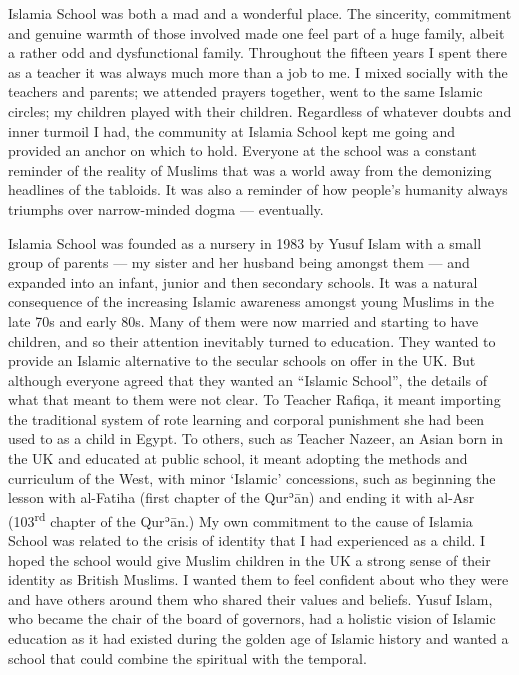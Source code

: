 \documentclass[12pt]{memoir}
\def\´{ʾ} %
\let \Sup=\textsuperscript
\def \Quran{Qur\-\´ān} %
\begin{document}
Islamia School was both a mad and a wonderful place.
The sincerity, commitment and genuine warmth of those involved
made one feel part of a huge family,
albeit a rather odd and dysfunctional family.
Throughout the fifteen years I spent there as a teacher
it was always much more than a job to me.
I mixed socially with the teachers and parents;
we attended prayers together, went to the same Islamic circles;
my children played with their children.
Regardless of whatever doubts and inner turmoil I had,
the community at Islamia School kept me going
and provided an anchor on which to hold.
Everyone at the school was a constant reminder of the reality of Muslims
that was a world away from the demonizing headlines of the tabloids.
It was also a reminder of how people’s humanity
always triumphs over narrow-minded dogma — eventually.

Islamia School was founded as a nursery in 1983
by Yusuf Islam with a small group of parents —
my sister and her husband being amongst them —
and expanded into an infant, junior and then secondary schools.
It was a natural consequence of the increasing Islamic awareness
amongst young Muslims in the late 70s and early 80s.
Many of them were now married and starting to have children,
and so their attention inevitably turned to education.
They wanted to provide an Islamic alternative
to the secular schools on offer in the UK.
But although everyone agreed that they wanted an “Islamic School”,
the details of what that meant to them were not clear.
To Teacher Rafiqa, it meant importing the traditional system of rote learning
and corporal punishment she had been used to as a child in Egypt.
To others, such as Teacher Nazeer, an Asian born in the UK
and educated at public school,
it meant adopting the methods and curriculum of the West,
with minor ‘Islamic’ concessions,
such as beginning the lesson with al-Fatiha (first chapter of the \Quran)
and ending it with al-Asr (103\Sup{rd} chapter of the \Quran.)
My own commitment to the cause of Islamia School was related
to the crisis of identity that I had experienced as a child.
I hoped the school would give Muslim children in the UK
a strong sense of their identity as British Muslims.
I wanted them to feel confident about who they were
and have others around them who shared their values and beliefs.
Yusuf Islam, who became the chair of the board of governors,
had a holistic vision of Islamic education as it had existed
during the golden age of Islamic history and wanted a school
that could combine the spiritual with the temporal.
\end{document}
